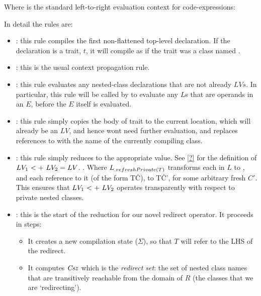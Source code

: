 
Where  is the standard left-to-right evaluation context for code-expressions:\\
\indent\parbox{\dimexpr\textwidth-\parindent}{\begin{grammar}
\end{grammar}}

\noindent In detail the rules are:
\begin{itemize}
	\item {}: this rule compiles the first non-flattened top-level declaration. If the declaration is a trait, $t$, it will compile as if the trait was a class named \This.
	\item {}: this is the usual context propagation rule.
	\item {}: this rule evaluates any nested-class declarations that are not already $LVs$. In particular, this rule will be called by  to evaluate any $L$s that are operands in an $E$, before the $E$ itself is evaluated.
	\item {}: this rule simply copies the body of trait to the current location, which will already be an $LV$, and hence wont need further evaluation, and replaces references to \This with the name of the currently compiling class.
	\item {}: this rule simply reduces to the appropriate value. See \autoref{?} for the definition of $\summ{LV_1}{LV_2}=LV$. . Where $L{{}_{.{refreshPrivate}({T})}}$ transforms each  in $L$ to , and each reference to it (of the form T\.C), to T\.C', for some arbitrary fresh $C'$. This ensures that $\summ{LV_1}{LV_2}$ operates transparently with respect to private nested classes.  
	\item {}: this is the start of the reduction for our novel redirect operator. It proceeds in steps:
	\begin{itemize}
		\item It creates a new compilation state ($\Sigma$), so that $T$ will refer to the LHS of the redirect.
		\item It computes $\mathit{Csz}$ which is the \emph{redirect set}: the set of nested class names that are transitively reachable from the domain of $R$ (the classes that we are `redirecting').

\end{itemize}
\end{itemize}
